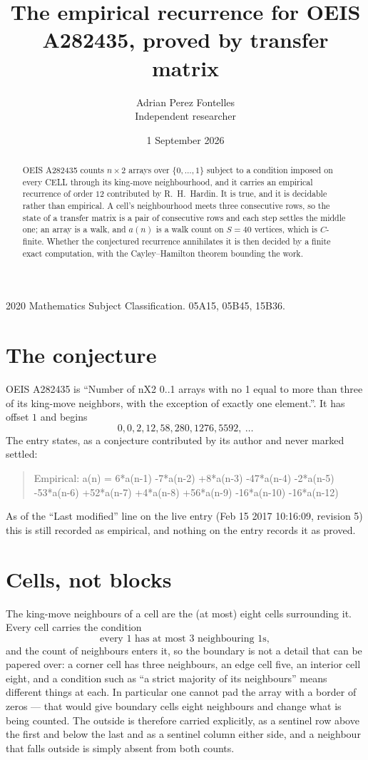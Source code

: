 \documentclass[11pt,a4paper]{article}
\title{The empirical recurrence for OEIS A282435, proved by transfer matrix}
\author{Adrian Perez Fontelles\\ \small Independent researcher}
\date{1 September 2026}
\theoremstyle{plain}
\theoremstyle{definition}
\begin{document}
\maketitle

\begin{abstract}
OEIS A282435 counts $n\times2$ arrays over $\{0,\dots,1\}$ subject to a condition imposed on
every CELL through its king-move neighbourhood, and it carries an empirical recurrence of
order $12$ contributed by R.~H.~Hardin. It is true, and it is decidable rather than
empirical. A cell's neighbourhood meets three consecutive rows, so the state of a transfer
matrix is a pair of consecutive rows and each step settles the middle one; an array is a
walk, and $a(n)$ is a walk count on $S=40$ vertices, which is $C$-finite. Whether the
conjectured recurrence annihilates it is then decided by a finite exact computation, with the
Cayley--Hamilton theorem bounding the work.
\end{abstract}

\noindent\small 2020 Mathematics Subject Classification. 05A15, 05B45, 15B36.\normalsize

\section{The conjecture}

OEIS A282435 is ``Number of nX2 0..1 arrays with no 1 equal to more than three of its king-move neighbors, with the exception of exactly one element.''. It has offset $1$ and begins
\[
0, 0, 2, 12, 58, 280, 1276, 5592,\ \dots
\]
The entry states, as a conjecture contributed by its author and never marked settled:
\begin{quote}
Empirical: a(n) = 6*a(n-1) -7*a(n-2) +8*a(n-3) -47*a(n-4) -2*a(n-5) -53*a(n-6) +52*a(n-7) +4*a(n-8) +56*a(n-9) -16*a(n-10) -16*a(n-12)
\end{quote}
As of the ``Last modified'' line on the live entry (Feb 15 2017 10:16:09, revision 5) this is still
recorded as empirical, and nothing on the entry records it as proved.

\section{Cells, not blocks}

The king-move neighbours of a cell are the (at most) eight cells surrounding it. Every cell
carries the condition
\[
\text{every }1\text{ has at most }3\text{ neighbouring }1\text{s},
\]
and the count of neighbours enters it, so the boundary is not a detail that can be papered
over: a corner cell has three neighbours, an edge cell five, an interior cell eight, and a
condition such as ``a strict majority of its neighbours'' means different things at each. In
particular one cannot pad the array with a border of zeros --- that would give boundary cells
eight neighbours and change what is being counted. The outside is therefore carried
explicitly, as a sentinel row above the first and below the last and as a sentinel column
either side, and a neighbour that falls outside is simply absent from both counts.
\end{document}
